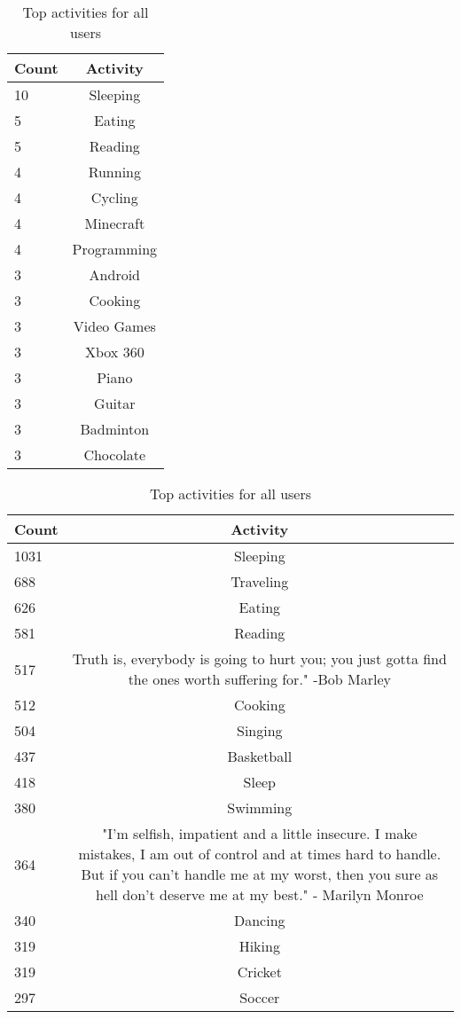\clearpage





\begin{table}[h]
\begin{minipage}[b]{.50\textwidth}
\centering
  \begin{tabular}{|l|c|} %
  \hline
  		\textbf{Count} & \textbf{Activity} \\ \hline
  		10 & Sleeping \\ \hline
		5 & Eating \\ \hline
		5 & Reading \\ \hline
		4 & Running \\ \hline
		4 & Cycling \\ \hline
		4 & Minecraft \\ \hline
		4 & Programming \\ \hline
		3 & Android \\ \hline
		3 & Cooking \\ \hline
		3 & Video Games \\ \hline
		3 & Xbox 360 \\ \hline
		3 & Piano \\ \hline
		3 & Guitar \\ \hline
		3 & Badminton \\ \hline
		3 & Chocolate \\ \hline
  \end{tabular}
  \caption{Top activities for app users}
\end{minipage}
\begin{minipage}[b]{.50\textwidth}
\centering
  \begin{tabular}{|l|c|} %
  \hline
  		\textbf{Count} & \textbf{Activity} \\ \hline
  		1031 & Sleeping \\ \hline
		688 & Traveling \\ \hline
		626 & Eating \\ \hline
		581 & Reading \\ \hline
		517 & Truth is, everybody is going to hurt you; you just gotta find the ones worth suffering for." -Bob Marley \\ \hline
		512 & Cooking \\ \hline
		504 & Singing \\ \hline
		437 & Basketball \\ \hline
		418 & Sleep \\ \hline
		380 & Swimming \\ \hline
		364 & "I'm selfish, impatient and a little insecure. I make mistakes, I am out of control and at times hard to handle. But if you can't handle me at my worst, then you sure as hell don't deserve me at my best."  - Marilyn Monroe \\ \hline
		340 & Dancing \\ \hline
		319 & Hiking \\ \hline
		319 & Cricket \\ \hline
		297 & Soccer \\ \hline
  \end{tabular}
  \caption{Top activities for all users}
\end{minipage}


\end{table}
